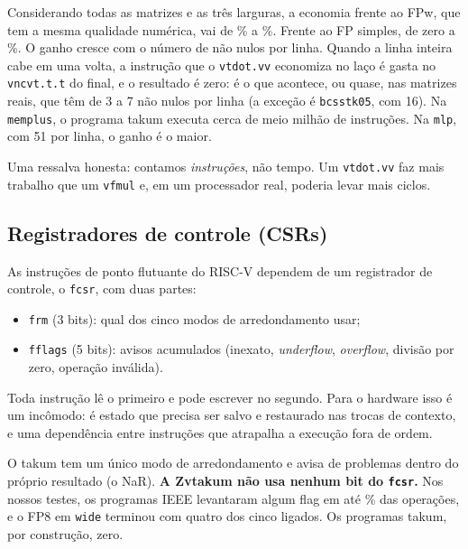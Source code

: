 \documentclass[11pt,a4paper]{article}
\newcommand{\code}[1]{\texttt{#1}}
\begin{document}
Considerando todas as matrizes e as três larguras, a economia frente ao FPw, que tem a mesma qualidade
numérica, vai de \SAVEWLO\% a \SAVEWHI\%. Frente ao FP simples, de zero a \SAVEPHI\%. O ganho cresce com o
número de não nulos por linha. Quando a linha inteira cabe em uma volta, a instrução que o
\code{vtdot.vv} economiza no laço é gasta no \code{vncvt.t.t} do final, e o resultado é zero: é o que acontece, ou quase, nas matrizes reais, que têm de 3 a 7 não nulos por linha (a exceção é
\code{bcsstk05}, com 16). Na \code{memplus}, o programa takum executa cerca de meio milhão de instruções.
Na \code{mlp}, com 51 por linha, o ganho é o maior.

Uma ressalva honesta: contamos \emph{instruções}, não tempo. Um \code{vtdot.vv} faz mais trabalho que
um \code{vfmul} e, em um processador real, poderia levar mais ciclos.

\subsection{Registradores de controle (CSRs)}

As instruções de ponto flutuante do RISC-V dependem de um registrador de controle, o \code{fcsr}, com
duas partes:
\begin{itemize}[nosep]
  \item \code{frm} (3 bits): qual dos cinco modos de arredondamento usar;
  \item \code{fflags} (5 bits): avisos acumulados (inexato, \emph{underflow}, \emph{overflow}, divisão por
        zero, operação inválida).
\end{itemize}
Toda instrução lê o primeiro e pode escrever no segundo. Para o hardware isso é um incômodo: é estado que
precisa ser salvo e restaurado nas trocas de contexto, e uma dependência entre instruções que atrapalha a
execução fora de ordem.

O takum tem um único modo de arredondamento e avisa de problemas dentro do próprio resultado (o NaR).
\textbf{A Zvtakum não usa nenhum bit do \code{fcsr}.} Nos nossos testes, os programas IEEE levantaram algum
flag em até \FLAGPCT\% das operações, e o FP8 em \code{wide} terminou com quatro dos cinco ligados. Os
programas takum, por construção, zero.
\end{document}
